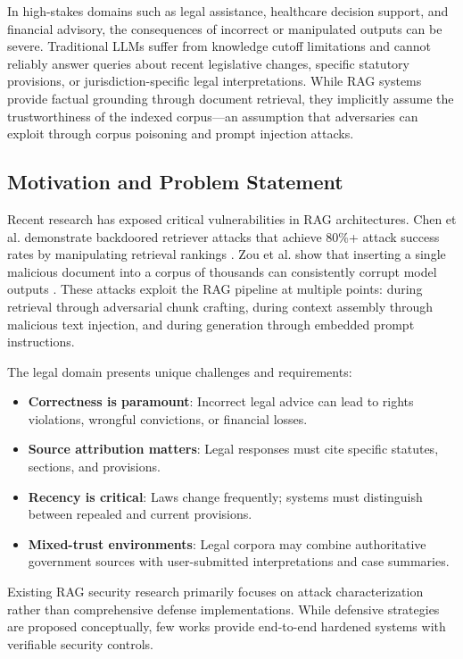 \documentclass[conference]{IEEEtran}
\begin{document}
In high-stakes domains such as legal assistance, healthcare decision support, and financial advisory, the consequences of incorrect or manipulated outputs can be severe. Traditional LLMs suffer from knowledge cutoff limitations and cannot reliably answer queries about recent legislative changes, specific statutory provisions, or jurisdiction-specific legal interpretations. While RAG systems provide factual grounding through document retrieval, they implicitly assume the trustworthiness of the indexed corpus—an assumption that adversaries can exploit through corpus poisoning and prompt injection attacks.

\subsection{Motivation and Problem Statement}

Recent research has exposed critical vulnerabilities in RAG architectures. Chen et al. demonstrate backdoored retriever attacks that achieve 80\%+ attack success rates by manipulating retrieval rankings \cite{b1}. Zou et al. show that inserting a single malicious document into a corpus of thousands can consistently corrupt model outputs \cite{b2}. These attacks exploit the RAG pipeline at multiple points: during retrieval through adversarial chunk crafting, during context assembly through malicious text injection, and during generation through embedded prompt instructions.

The legal domain presents unique challenges and requirements:
\begin{itemize}
    \item \textbf{Correctness is paramount}: Incorrect legal advice can lead to rights violations, wrongful convictions, or financial losses.
    \item \textbf{Source attribution matters}: Legal responses must cite specific statutes, sections, and provisions.
    \item \textbf{Recency is critical}: Laws change frequently; systems must distinguish between repealed and current provisions.
    \item \textbf{Mixed-trust environments}: Legal corpora may combine authoritative government sources with user-submitted interpretations and case summaries.
\end{itemize}

Existing RAG security research primarily focuses on attack characterization rather than comprehensive defense implementations. While defensive strategies are proposed conceptually, few works provide end-to-end hardened systems with verifiable security controls.
\end{document}
